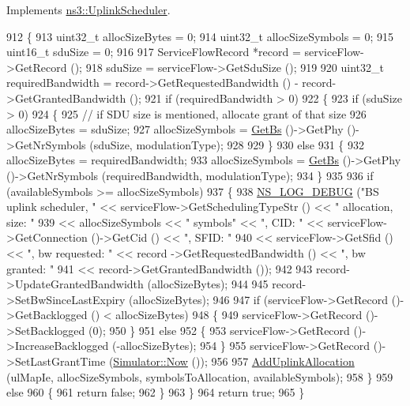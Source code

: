 Implements \hyperlink{classns3_1_1UplinkScheduler_a6e702b7f0bdb490a762b5e2b9b13c362}{ns3\+::\+Uplink\+Scheduler}.


\begin{DoxyCode}
912 \{
913   uint32\_t allocSizeBytes = 0;
914   uint32\_t allocSizeSymbols = 0;
915   uint16\_t sduSize = 0;
916 
917   ServiceFlowRecord *record = serviceFlow->GetRecord ();
918   sduSize = serviceFlow->GetSduSize ();
919 
920   uint32\_t requiredBandwidth = record->GetRequestedBandwidth () - record->GetGrantedBandwidth ();
921   \textcolor{keywordflow}{if} (requiredBandwidth > 0)
922     \{
923       \textcolor{keywordflow}{if} (sduSize > 0)
924         \{
925           \textcolor{comment}{// if SDU size is mentioned, allocate grant of that size}
926           allocSizeBytes = sduSize;
927           allocSizeSymbols = \hyperlink{classns3_1_1UplinkScheduler_afe61b7de71d92d2dff1b135744a6ff7e}{GetBs} ()->GetPhy ()->GetNrSymbols (sduSize, modulationType);
928 
929         \}
930       \textcolor{keywordflow}{else}
931         \{
932           allocSizeBytes = requiredBandwidth;
933           allocSizeSymbols = \hyperlink{classns3_1_1UplinkScheduler_afe61b7de71d92d2dff1b135744a6ff7e}{GetBs} ()->GetPhy ()->GetNrSymbols (requiredBandwidth, modulationType);
934         \}
935 
936       \textcolor{keywordflow}{if} (availableSymbols >= allocSizeSymbols)
937         \{
938           \hyperlink{group__logging_ga413f1886406d49f59a6a0a89b77b4d0a}{NS\_LOG\_DEBUG} (\textcolor{stringliteral}{"BS uplink scheduler, "} << serviceFlow->GetSchedulingTypeStr () << \textcolor{stringliteral}{"
       allocation, size: "}
939                                                 << allocSizeSymbols << \textcolor{stringliteral}{" symbols"} << \textcolor{stringliteral}{", CID: "} << 
      serviceFlow->GetConnection ()->GetCid () << \textcolor{stringliteral}{", SFID: "}
940                                                 << serviceFlow->GetSfid () << \textcolor{stringliteral}{", bw requested: "} << record
      ->GetRequestedBandwidth () << \textcolor{stringliteral}{", bw granted: "}
941                                                 << record->GetGrantedBandwidth ());
942 
943           record->UpdateGrantedBandwidth (allocSizeBytes);
944 
945           record->SetBwSinceLastExpiry (allocSizeBytes);
946 
947           \textcolor{keywordflow}{if} (serviceFlow->GetRecord ()->GetBacklogged () < allocSizeBytes)
948             \{
949               serviceFlow->GetRecord ()->SetBacklogged (0);
950             \}
951           \textcolor{keywordflow}{else}
952             \{
953               serviceFlow->GetRecord ()->IncreaseBacklogged (-allocSizeBytes);
954             \}
955           serviceFlow->GetRecord ()->SetLastGrantTime (\hyperlink{classns3_1_1Simulator_ac3178fa975b419f7875e7105be122800}{Simulator::Now} ());
956 
957           \hyperlink{classns3_1_1UplinkSchedulerMBQoS_a23b74ad65ec3d22b55d25648addd7486}{AddUplinkAllocation} (ulMapIe, allocSizeSymbols, symbolsToAllocation, 
      availableSymbols);
958         \}
959       \textcolor{keywordflow}{else}
960         \{
961           \textcolor{keywordflow}{return} \textcolor{keyword}{false};
962         \}
963     \}
964   \textcolor{keywordflow}{return} \textcolor{keyword}{true};
965 \}
\end{DoxyCode}


